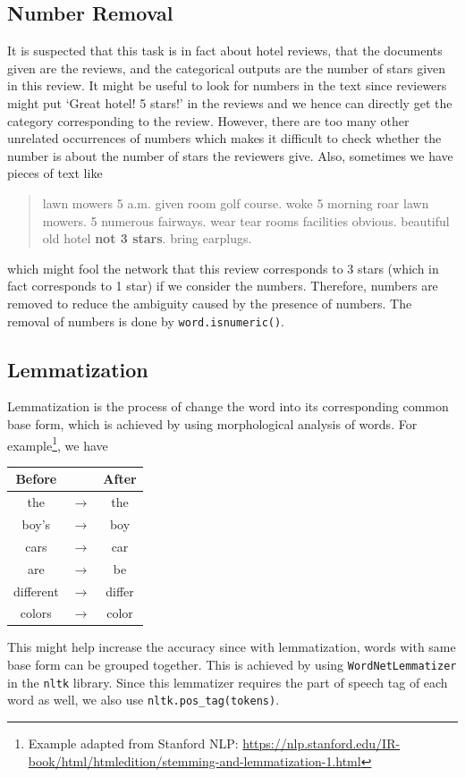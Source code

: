 \documentclass[12pt]{article}
\theoremstyle{remark}
\begin{document}
\subsection{Number Removal}
It is suspected that this task is in fact about hotel reviews, that the documents given are the reviews, and the categorical outputs are the number of stars given in this review. It might be useful to look for numbers in the text since reviewers might put `Great hotel! 5 stars!' in the reviews and we hence can directly get the category corresponding to the review. However, there are too many other unrelated occurrences of numbers which makes it difficult to check whether the number is about the number of stars the reviewers give. Also, sometimes we have pieces of text like
\begin{quote}
	lawn mowers 5 a.m. given room golf course. woke 5 morning roar lawn mowers. 5 numerous fairways. wear tear rooms facilities obvious. beautiful old hotel \textbf{not 3 stars}. bring earplugs.
\end{quote}
which might fool the network that this review corresponds to 3 stars (which in fact corresponds to 1 star) if we consider the numbers. Therefore, numbers are removed to reduce the ambiguity caused by the presence of numbers. The removal of numbers is done by \lstinline[language=python]{word.isnumeric()}.

\subsection{Lemmatization}
Lemmatization is the process of change the word into its corresponding common base form, which is achieved by using morphological analysis of words. For example\footnote{Example adapted from Stanford NLP: \url{ https://nlp.stanford.edu/IR-book/html/htmledition/stemming-and-lemmatization-1.html}}, we have
\begin{center}
	\begin{tabular}{ccc}
		\toprule
		\textbf{Before} &                 & \textbf{After} \\\midrule
		the             & \(\rightarrow\) & the            \\\midrule
		boy's           & \(\rightarrow\) & boy            \\\midrule
		cars            & \(\rightarrow\) & car            \\\midrule
		are             & \(\rightarrow\) & be             \\\midrule
		different       & \(\rightarrow\) & differ         \\\midrule
		colors          & \(\rightarrow\) & color          \\\bottomrule
	\end{tabular}
\end{center}
This might help increase the accuracy since with lemmatization, words with same base form can be grouped together. This is achieved by using \lstinline[language=python]{WordNetLemmatizer} in the \texttt{nltk} library. Since this lemmatizer requires the part of speech tag of each word as well, we also use \lstinline[language=python]{nltk.pos_tag(tokens)}.
\end{document}
